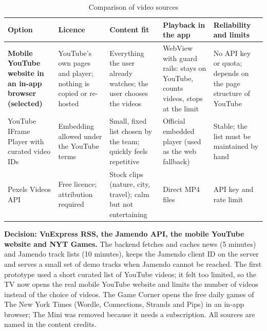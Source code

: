 \begin{longtable}{|>{\raggedright\arraybackslash}p{3.2cm}|>{\raggedright\arraybackslash}p{2.9cm}|>{\raggedright\arraybackslash}p{2.9cm}|>{\raggedright\arraybackslash}p{2.7cm}|>{\raggedright\arraybackslash}p{2.7cm}|}

\caption{Comparison of video sources}\label{tab:tech-video}\\

\hline

\textbf{Option} & \textbf{Licence} & \textbf{Content fit} & \textbf{Playback in the app} & \textbf{Reliability and limits} \\ \hline

\textbf{Mobile YouTube website in an in-app browser (selected)} & YouTube's own pages and player; nothing is copied or re-hosted &

Everything the user already watches; the user chooses the videos &

WebView with guard rails: stays on YouTube, counts videos, stops at the limit &

No API key or quota; depends on the page structure of YouTube \\ \hline

YouTube IFrame Player with curated video IDs & Embedding allowed under the YouTube terms &

Small, fixed list chosen by the team; quickly feels repetitive &

Official embedded player (used as the web fallback) &

Stable; the list must be maintained by hand \\ \hline

Pexels Videos API & Free licence; attribution required &

Stock clips (nature, city, travel); calm but not entertaining &

Direct MP4 files &

API key and rate limit \\ \hline

\end{longtable}

\endgroup

\noindent\textbf{Decision: VnExpress RSS, the Jamendo API, the mobile YouTube website and NYT Games.} The backend fetches and caches news (5 minutes) and Jamendo track lists (10 minutes), keeps the Jamendo client ID on the server and serves a small set of demo tracks when Jamendo cannot be reached. The first prototype used a short curated list of YouTube videos; it felt too limited, so the TV now opens the real mobile YouTube website and limits the number of videos instead of the choice of videos. The Game Corner opens the free daily games of The New York Times (Wordle, Connections, Strands and Pips) in an in-app browser; The Mini was removed because it needs a subscription. All sources are named in the content credits.

